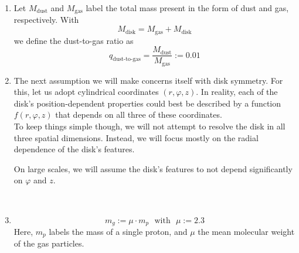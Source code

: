 \begin{enumerate}
        \item {}
            Let $M_\text{dust}$ and $M_\text{gas}$ label the total mass present in the form of dust 
            and gas, respectively. 
            With
            \begin{equation}
                M_\text{disk} = M_\text{gas} + M_\text{disk}
            \end{equation}
            we define the dust-to-gas ratio as
            \begin{equation}
                q_\text{dust-to-gas}=\frac{M_\text{dust}}{M_\text{gas}}:=0.01
            \end{equation}
    
        \item The next assumption we will make concerns itself with disk symmetry. For this, let us 
            adopt cylindrical coordinates $(r, \varphi, z)$. In reality, each of the disk's 
            position-dependent properties could best be described by a function $f(r, \varphi, z)$ 
            that depends on all three of these coordinates. \\
            To keep things simple though, we will not attempt to resolve the disk in all three 
            spatial dimensions. Instead, we will focus mostly on the radial dependence of the 
            disk's features.
    
            On large scales, we will assume the disk's features to not depend significantly on 
            $\varphi$ and $z$.
    
             \\

    
        \item {}
            \begin{equation}
                m_g := \mu\cdot m_p
                \ \ \ \text{with}\ \ \
                \mu := 2.3
            \end{equation}
            Here, $m_p$ labels the mass of a single proton, and $\mu$ the mean molecular weight of 
            the gas particles.


\end{enumerate}
